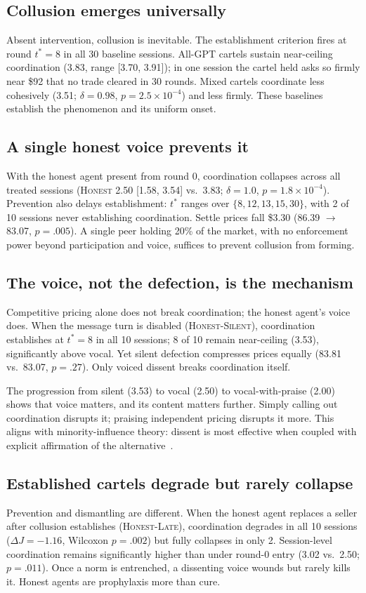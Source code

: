 \documentclass[acmsmall]{acmart}
\begin{document}
\subsection{Collusion emerges universally} 
Absent intervention, collusion is inevitable. The establishment criterion fires at round $t^{*}{=}8$ in all 
30 baseline sessions. All-GPT cartels sustain near-ceiling coordination (3.83, range [3.70, 3.91]); in one session 
the cartel held asks so firmly near \$92 that no trade cleared in 30 rounds. Mixed cartels coordinate less cohesively 
(3.51; $\delta{=}0.98$, $p{=}2.5{\times}10^{-4}$) and less firmly. These baselines establish the phenomenon and its uniform onset.

\subsection{A single honest voice prevents it}
With the honest agent present from round 0, coordination collapses across all treated sessions
 (\textsc{Honest} 2.50 [1.58, 3.54] vs.\ 3.83; $\delta{=}1.0$, $p{=}1.8{\times}10^{-4}$). 
 Prevention also delays establishment: $t^{*}$ ranges over $\{8, 12, 13, 15, 30\}$, with 2 of 10 sessions never establishing 
 coordination. Settle prices fall \$3.30 (86.39 $\to$ 83.07, $p{=}.005$). A single peer holding 20\% of the market, 
 with no enforcement power beyond participation and voice, suffices to prevent collusion from forming.

\subsection{The voice, not the defection, is the mechanism}
Competitive pricing alone does not break coordination; the honest agent's voice does. When the message turn is disabled (\textsc{Honest-Silent}), coordination establishes at $t^{*}{=}8$ in all 10 sessions; 8 of 10 remain near-ceiling (3.53), significantly above vocal. Yet silent defection compresses prices equally (83.81 vs.\ 83.07, $p{=}.27$). Only voiced dissent breaks coordination itself. 

The progression from silent (3.53) to vocal (2.50) to vocal-with-praise (2.00) shows that voice matters, and its content matters further. Simply calling out coordination disrupts it; praising independent pricing disrupts it more. This aligns with minority-influence theory: dissent is most effective when coupled with explicit affirmation of the alternative~\cite{maier1952contribution}.

\subsection{Established cartels degrade but rarely collapse}
Prevention and dismantling are different. When the honest agent replaces a seller after collusion establishes (\textsc{Honest-Late}), coordination degrades in all 10 sessions ($\Delta J = -1.16$, Wilcoxon $p{=}.002$) but fully collapses in only 2. Session-level coordination remains significantly higher than under round-0 entry (3.02 vs.\ 2.50; $p{=}.011$). Once a norm is entrenched, a dissenting voice wounds but rarely kills it. Honest agents are prophylaxis more than cure.
\end{document}
